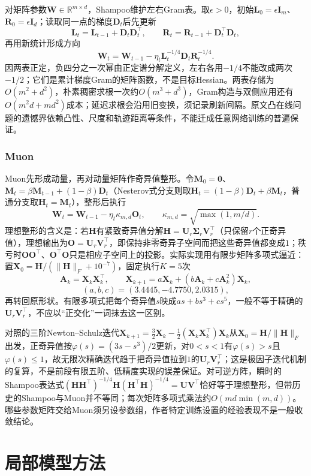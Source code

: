 对矩阵参数$\bm W\in\mathbb R^{m\times d}$，Shampoo维护左右Gram表。取$\epsilon>0$，初始$\bm L_0=\epsilon\bm I_m$、$\bm R_0=\epsilon\bm I_d$；读取同一点的梯度$\bm D_t$后先更新
\[
 \bm L_t=\bm L_{t-1}+\bm D_t\bm D_t^\top,\qquad
 \bm R_t=\bm R_{t-1}+\bm D_t^\top\bm D_t,
\]
再用新统计形成方向
\[
 \bm W_t=\bm W_{t-1}-\eta_t\bm L_t^{-1/4}\bm D_t\bm R_t^{-1/4}.
\]
因两表正定，负四分之一次幂由正定谱分解定义，左右各用$-1/4$不能改成两次$-1/2$；它们是累计梯度Gram的矩阵函数，不是目标Hessian。两表存储为$O(m^2+d^2)$，朴素稠密求根一次约$O(m^3+d^3)$，Gram构造与双侧应用还有$O(m^2d+md^2)$成本；延迟求根会沿用旧变换，须记录刷新间隔。原文凸在线问题的遗憾界依赖凸性、尺度和轨迹距离等条件，不能迁成任意网络训练的普遍保证。

\subsubsection{Muon}

Muon先形成动量，再对动量矩阵作奇异值整形。令$\bm M_0=\bm0$、$\bm M_t=\beta\bm M_{t-1}+(1-\beta)\bm D_t$（Nesterov式分支则取$\bm H_t=(1-\beta)\bm D_t+\beta\bm M_t$，普通分支取$\bm H_t=\bm M_t$），整形后执行
\[
 \bm W_t=\bm W_{t-1}-\eta_t\kappa_{m,d}\widehat{\bm O}_t,\qquad
 \kappa_{m,d}=\sqrt{\max(1,m/d)}.
\]
理想整形的含义是：若$\bm H$有紧致奇异值分解$\bm H=\bm U_r\bm\Sigma_r\bm V_r^\top$（只保留$r$个正奇异值），理想输出为$\bm O=\bm U_r\bm V_r^\top$，即保持非零奇异子空间而把这些奇异值都变成$1$；秩亏时$\bm O\bm O^\top$、$\bm O^\top\bm O$只是相应子空间上的投影。实际实现用有限步矩阵多项式逼近：置$\bm X_0=\bm H/(\|\bm H\|_F+10^{-7})$，固定执行$K=5$次
\[
 \bm A_k=\bm X_k\bm X_k^\top,\qquad
 \bm X_{k+1}=a\bm X_k+(b\bm A_k+c\bm A_k^2)\bm X_k,
\]
\[
 (a,b,c)=(3.4445,-4.7750,2.0315),
\]
再转回原形状。有限多项式把每个奇异值$s$映成$as+bs^3+cs^5$，一般不等于精确的$\bm U_r\bm V_r^\top$，不应以“正交化”一词抹去这一区别。

对照的三阶Newton--Schulz迭代$\bm X_{k+1}=\frac32\bm X_k-\frac12(\bm X_k\bm X_k^\top)\bm X_k$从$\bm X_0=\bm H/\|\bm H\|_F$出发，正奇异值按$\varphi(s)=(3s-s^3)/2$更新，对$0<s<1$有$\varphi(s)>s$且$\varphi(s)\leq1$，故无限次精确迭代趋于把奇异值拉到$1$的$\bm U_r\bm V_r^\top$；这是极因子迭代机制的复算，不是前段有限五阶、低精度实现的误差保证。对可逆方阵，瞬时的Shampoo表达式$(\bm H\bm H^\top)^{-1/4}\bm H(\bm H^\top\bm H)^{-1/4}=\bm U\bm V^\top$恰好等于理想整形，但带历史的Shampoo与Muon并不等同；每次矩阵多项式乘法约$O(md\min(m,d))$。哪些参数矩阵交给Muon须另设参数组，作者特定训练设置的经验表现不是一般收敛结论。


\section{局部模型方法}
\label{sec:opt-second-order-methods}

